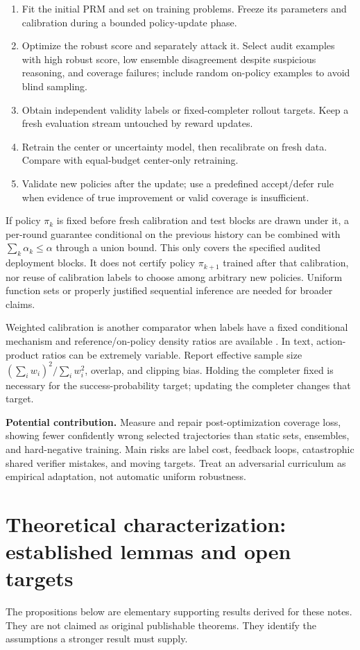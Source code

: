 \begin{enumerate}
\item Fit the initial PRM and set on training problems. Freeze its parameters
and calibration during a bounded policy-update phase.
\item Optimize the robust score and separately attack it. Select audit examples
with high robust score, low ensemble disagreement despite suspicious reasoning,
and coverage failures; include random on-policy examples to avoid blind sampling.
\item Obtain independent validity labels or fixed-completer rollout targets.
Keep a fresh evaluation stream untouched by reward updates.
\item Retrain the center or uncertainty model, then recalibrate on fresh data.
Compare with equal-budget center-only retraining.
\item Validate new policies after the update; use a predefined accept/defer rule
when evidence of true improvement or valid coverage is insufficient.
\end{enumerate}

If policy $\pi_k$ is fixed before fresh calibration and test blocks are drawn
under it, a per-round guarantee conditional on the previous history can be
combined with $\sum_k\alpha_k\le\alpha$ through a union bound. This only covers
the specified audited deployment blocks. It does not certify policy $\pi_{k+1}$
trained after that calibration, nor reuse of calibration labels to choose among
arbitrary new policies. Uniform function sets or properly justified sequential
inference are needed for broader claims.

Weighted calibration is another comparator when labels have a fixed conditional
mechanism and reference/on-policy density ratios are available \cite{weighted}.
In text, action-product ratios can be extremely variable. Report effective
sample size $(\sum_iw_i)^2/\sum_iw_i^2$, overlap, and clipping bias. Holding the
completer fixed is necessary for the success-probability target; updating the
completer changes that target.

\textbf{Potential contribution.} Measure and repair post-optimization coverage
loss, showing fewer confidently wrong selected trajectories than static sets,
ensembles, and hard-negative training. Main risks are label cost, feedback loops,
catastrophic shared verifier mistakes, and moving targets. Treat an adversarial
curriculum as empirical adaptation, not automatic uniform robustness.

\section{Theoretical characterization: established lemmas and open targets}
\label{sec:theory}
The propositions below are elementary supporting results derived for these notes.
They are not claimed as original publishable theorems. They identify the
assumptions a stronger result must supply.

